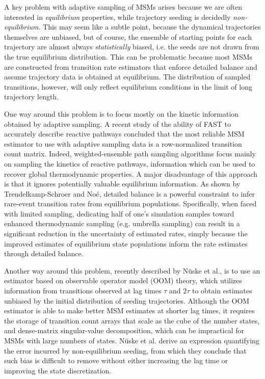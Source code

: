 \documentclass[%
 aip,
rsi,%
 amsmath,amssymb,
 reprint,%
]{revtex4-1}
\begin{document}
A key problem with adaptive sampling of MSMs arises because we are often interested in \textit{equilibrium} properties, while trajectory seeding is decidedly \textit{non-equilibrium}.  This may seem like a subtle point, because the dynamical trajectories themselves are unbiased, but of course, the ensemble of starting points for each trajectory are almost always \textit{statistically} biased, i.e. the seeds are not drawn from the true equilibrium distribution.  This can be problematic because most MSMs are constructed from transition rate estimators that enforce detailed balance and assume trajectory data is obtained at equilibrium. The distribution of sampled transitions, however, will only reflect equilibrium conditions in the limit of long trajectory length.

One way around this problem is to focus mostly on the kinetic information obtained by adaptive sampling.  A recent study of the ability of FAST to accurately describe reactive pathways concluded that the most reliable MSM estimator to use with adaptive sampling data is a row-normalized transition count matrix.\cite{Zimmerman:2018jn} Indeed, weighted-ensemble path sampling algorithms focus mainly on sampling the kinetics of reactive pathways, information which can be used to recover global thermodynamic properties.\cite{BinWZhang:2010kf,Zwier:2015fn, Dickson:2016it, Lotz:2018hx, Dixon:2018fs} A major disadvantage of this approach is that it ignores potentially valuable equilibrium information.  As shown by Trendelkamp-Schroer and No{\'e},\cite{TrendelkampSchroer:2016bz} detailed balance is a powerful constraint to infer rare-event transition rates from equilibrium populations.  Specifically, when faced with limited sampling, dedicating half of one's simulation samples toward enhanced thermodynamic sampling (e.g. umbrella sampling) can result in a significant reduction in the uncertainty of estimated rates, simply because the improved estimates of equilibrium state populations inform the rate estimates through detailed balance.

Another way around this problem, recently described by N{\"u}ske et al., is to use an estimator based on observable operator model (OOM) theory, which utilizes information from transitions observed at lag times $\tau$ and $2\tau$ to obtain estimates unbiased by the initial distribution of seeding trajectories.\cite{Nuske:2017ex}  Although the OOM estimator is able to make better MSM estimates at shorter lag times, it requires the storage of transition count arrays that scale as the cube of the number states, and dense-matrix singular-value decomposition, which can be impractical for MSMs with large numbers of states.  N{\"u}ske et al. derive an expression quantifying the error incurred by non-equilibrium seeding, from which they conclude that such bias is difficult to remove without either increasing the lag time or improving the state discretization.  
\end{document}

